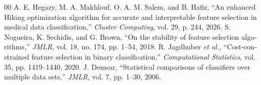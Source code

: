 \documentclass[10pt,journal,a4paper]{IEEEtran}
\newcommand{\lr}[1]{\foreignlanguage{english}{#1}}
\begin{document}
{\linespread{0.88}\selectfont
\begin{thebibliography}{00}
 \lr{A. E. Hegazy, M. A. Makhlouf, O. A. M. Salem, and B. Hafiz, ``An enhanced Hiking optimization algorithm for accurate and interpretable feature selection in medical data classification,'' \emph{Cluster Computing}, vol. 29, p. 244, 2026.}
 \lr{S. Nogueira, K. Sechidis, and G. Brown, ``On the stability of feature selection algorithms,'' \emph{JMLR}, vol. 18, no. 174, pp. 1--54, 2018.}
 \lr{R. Jagdhuber \emph{et al.}, ``Cost-constrained feature selection in binary classification,'' \emph{Computational Statistics}, vol. 35, pp. 1419--1440, 2020.}
 \lr{J. Demsar, ``Statistical comparisons of classifiers over multiple data sets,'' \emph{JMLR}, vol. 7, pp. 1--30, 2006.}
\end{thebibliography}
}
\end{document}
